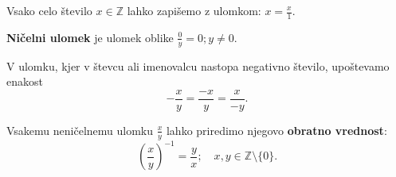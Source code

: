         \begin{frame}

            \begin{block}{}
                Vsako celo število $x\in\mathbb{Z}$ lahko zapišemo z ulomkom: $x=\frac{x}{1}$.
            \end{block}

            \begin{block}{}
                \textbf{Ničelni ulomek} je ulomek oblike $\frac{0}{y}=0; y\neq 0$.
            \end{block}

            \begin{block}{}
                V ulomku, kjer v števcu ali imenovalcu nastopa negativno število, upoštevamo enakost $$-\frac{x}{y}=\frac{-x}{y}=\frac{x}{-y}.$$
            \end{block}

            \begin{alertblock}{}
                Vsakemu neničelnemu ulomku $\frac{x}{y}$ lahko priredimo njegovo \textbf{obratno vrednost}: $$\left(\frac{x}{y}\right)^{-1}=\frac{y}{x}; \quad x,y\in\mathbb{Z}\setminus\{0\}.$$
            \end{alertblock}

        \end{frame}


